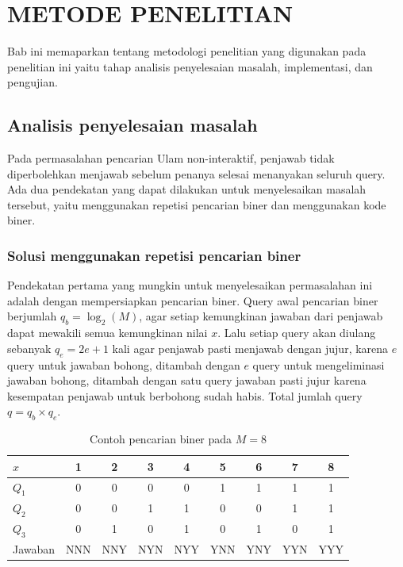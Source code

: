 \chapter{METODE PENELITIAN}

Bab ini memaparkan tentang metodologi penelitian yang digunakan pada penelitian ini yaitu tahap analisis penyelesaian masalah, implementasi, dan pengujian.

\section{Analisis penyelesaian masalah}

Pada permasalahan pencarian Ulam non-interaktif, penjawab tidak diperbolehkan menjawab sebelum penanya selesai menanyakan seluruh query. Ada dua pendekatan yang dapat dilakukan untuk menyelesaikan masalah tersebut, yaitu menggunakan repetisi pencarian biner dan menggunakan kode biner.

\subsection{Solusi menggunakan repetisi pencarian biner}

Pendekatan pertama yang mungkin untuk menyelesaikan permasalahan ini adalah dengan mempersiapkan pencarian biner. Query awal pencarian biner berjumlah $q_b=\log_2(M)$, agar setiap kemungkinan jawaban dari penjawab dapat mewakili semua kemungkinan nilai $x$. Lalu setiap query akan diulang sebanyak $q_e=2e+1$ kali agar penjawab pasti menjawab dengan jujur, karena $e$ query untuk jawaban bohong, ditambah dengan $e$ query untuk mengeliminasi jawaban bohong, ditambah dengan satu query jawaban pasti jujur karena kesempatan penjawab untuk berbohong sudah habis. Total jumlah query $q=q_b \times q_e$.

\begin{table}[h!]
\caption{Contoh pencarian biner pada $M=8$}
\label{tab:binary_8}
\begin{center}
\begin{tabular}{|l|c|c|c|c|c|c|c|c|}
\hline
$x$  & 1 & 2 & 3 & 4 & 5 & 6 & 7 & 8 \\
\hline
$Q_1$ & 0 & 0 & 0 & 0 & 1 & 1 & 1 & 1 \\
\hline
$Q_2$ & 0 & 0 & 1 & 1 & 0 & 0 & 1 & 1 \\
\hline
$Q_3$ & 0 & 1 & 0 & 1 & 0 & 1 & 0 & 1 \\
\hline
Jawaban & NNN & NNY & NYN & NYY & YNN & YNY & YYN & YYY \\
\hline
\end{tabular}
\end{center}
\end{table}

